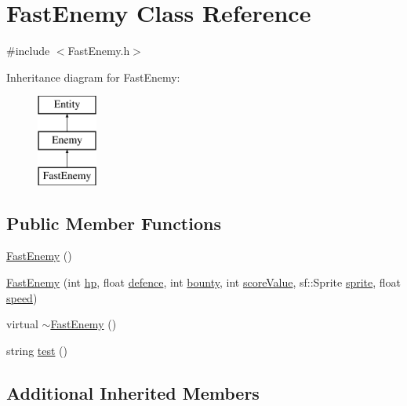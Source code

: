 \hypertarget{class_fast_enemy}{\section{Fast\+Enemy Class Reference}
\label{class_fast_enemy}
}


{\ttfamily \#include $<$Fast\+Enemy.\+h$>$}

Inheritance diagram for Fast\+Enemy\+:\begin{figure}[H]
\begin{center}
\leavevmode
\includegraphics[height=3.000000cm]{class_fast_enemy}
\end{center}
\end{figure}
\subsection*{Public Member Functions}
\begin{DoxyCompactItemize}
\item 
\hyperlink{class_fast_enemy_a22193a351c1600aa27a754dd1e98f828}{Fast\+Enemy} ()
\item 
\hyperlink{class_fast_enemy_a385d3a2fd3a4b83bfb0a9820ae5a9905}{Fast\+Enemy} (int \hyperlink{class_enemy_a278d70100af07c946743db1b7a1a9f59}{hp}, float \hyperlink{class_enemy_a9bb5d74024760e604c41ba79cc7da892}{defence}, int \hyperlink{class_enemy_a1d9a86d110b87f3cc55b40d1bdb59eb5}{bounty}, int \hyperlink{class_enemy_abc49d5a2cef917c8ece8a16547f8efee}{score\+Value}, sf\+::\+Sprite \hyperlink{class_entity_a48ef4ab143b8d0211877c9f6be42e824}{sprite}, float \hyperlink{class_entity_a1de3d8d9ab8088f61e6726069b26fa60}{speed})
\item 
virtual \hyperlink{class_fast_enemy_a40b6cd76a5b3d4339129b912b24ec353}{$\sim$\+Fast\+Enemy} ()
\item 
string \hyperlink{class_fast_enemy_ab6e1d144ceda128e4b2717a82a570b51}{test} ()
\end{DoxyCompactItemize}
\subsection*{Additional Inherited Members}


